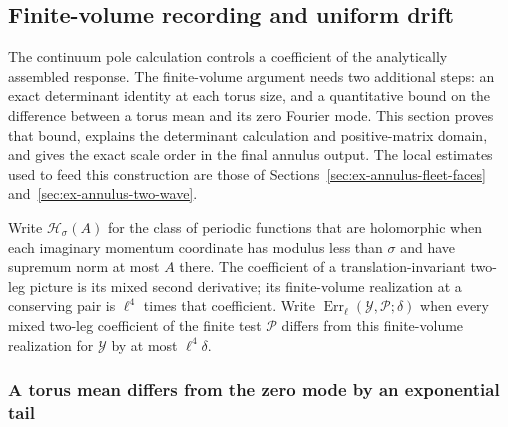 \subsection{Finite-volume recording and uniform drift}
\label{sec:ex-annulus-recording}

The continuum pole calculation controls a coefficient of the analytically
assembled response. The finite-volume argument needs two additional steps:
an exact determinant identity at each torus size, and a quantitative bound
on the difference between a torus mean and its zero Fourier mode. This
section proves that bound, explains the determinant calculation and
positive-matrix domain, and gives the exact scale order in the final
annulus output.
The local estimates used to feed this construction are those of
Sections~\ref{sec:ex-annulus-fleet-faces}
and~\ref{sec:ex-annulus-two-wave}.

Write $\mathcal H_\sigma(A)$ for the class of periodic functions that are
holomorphic when each imaginary momentum coordinate has modulus less than
$\sigma$ and have supremum norm at most $A$ there. The coefficient of a
translation-invariant two-leg picture is its mixed second derivative; its
finite-volume realization at a conserving pair is $\ell^4$ times that
coefficient. Write $\operatorname{Err}_\ell(\mathcal Y,\mathcal P;\delta)$
when every mixed two-leg coefficient of the finite test $\mathcal P$
differs from this finite-volume realization for $\mathcal Y$ by at most
$\ell^4\delta$.

\subsubsection{A torus mean differs from the zero mode by an exponential tail}

